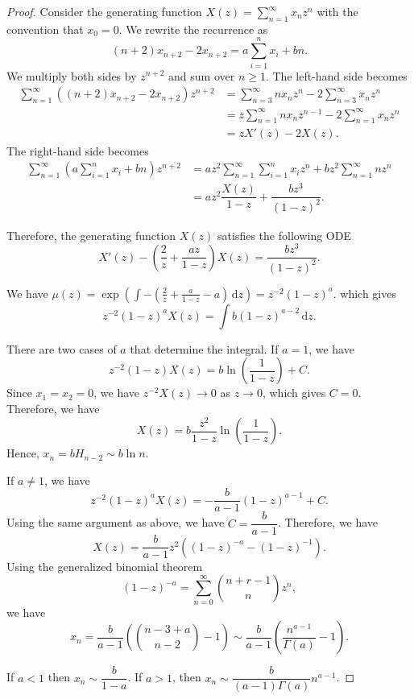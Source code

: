 \begin{proof}
  Consider the generating function $X(z) = \sum_{n=1}^{\infty} x_n z^n$ with the convention that $x_0=0$. We rewrite the recurrence as
  $$(n+2)x_{n+2} - 2x_{n+2} = a\sum_{i=1}^{n}x_i + bn.$$
  We multiply both sides by $z^{n+2}$ and sum over $n \ge 1$. The left-hand side becomes
  \begin{align*}
    \sum_{n=1}^{\infty}((n+2)x_{n+2} - 2x_{n+2})z^{n+2}
     & = \sum_{n=3}^{\infty}n x_{n}z^{n} - 2\sum_{n=3}^{\infty}x_{n}z^{n}     \\
     & = z \sum_{n=1}^{\infty}n x_{n}z^{n-1} - 2\sum_{n=1}^{\infty}x_{n}z^{n} \\
     & = z X'(z) - 2X(z).
  \end{align*}
  The right-hand side becomes
  \begin{align*}
    \sum_{n=1}^{\infty}(a\sum_{i=1}^{n}x_i + bn)z^{n+2}
     & = az^2\sum_{n=1}^{\infty}\sum_{i=1}^{n}x_i z^{n} + bz^2\sum_{n=1}^{\infty}nz^{n} \\
     & = az^2 \dfrac{X(z)}{1-z} + \dfrac{bz^3}{(1-z)^2}.
  \end{align*}

  Therefore, the generating function $X(z)$ satisfies the following ODE
  $$X'(z) - \left(\dfrac{2}{z} + \dfrac{az}{1-z}\right)X(z) = \dfrac{bz^3}{(1-z)^2}.$$

  We have $\mu(z) = \exp\left( \int -\left( \frac{2}{z} + \frac{a}{1-z} - a \right) \,\mathrm{d}z \right) = z^{-2} (1-z)^a$. which gives
  $$z^{-2} (1-z)^a X(z) = \int b (1-z)^{a-2} \,\mathrm{d}z.$$

  There are two cases of $a$ that determine the integral. If $a=1$, we have
  $$z^{-2} (1-z) X(z) = b\ln\left(\dfrac{1}{1-z}\right) + C.$$
  Since $x_1=x_2=0$, we have $z^{-2}X(z)\to 0$ as $z\to 0$, which gives $C=0$. Therefore, we have
  $$X(z) = b \dfrac{z^2}{1-z} \ln\left(\dfrac{1}{1-z}\right).$$
  Hence, $x_n = bH_{n-2} \sim b\ln n$.

  If $a \neq 1$, we have
  $$z^{-2} (1-z)^a X(z) = -\dfrac{b}{a-1} (1-z)^{a-1} + C.$$
  Using the same argument as above, we have $C= \dfrac{b}{a-1}$. Therefore, we have
  $$X(z) = \dfrac{b}{a-1}z^2 \left((1-z)^{-a}-(1-z)^{-1}\right).$$
  Using the generalized binomial theorem $$(1-z)^{-a} = \sum_{n=0}^{\infty} \binom{n+r-1}{n} z^n,$$ we have
  $$x_n = \dfrac{b}{a-1}\left(\binom{n-3+a}{n-2} - 1\right) \sim \dfrac{b}{a-1}\left(\dfrac{n^{a-1}}{\Gamma(a)}-1\right).$$

  If $a<1$ then $x_n \sim \dfrac{b}{1-a}$. If $a>1$, then $x_n  \sim \dfrac{b}{(a-1)\Gamma(a)} n^{a-1}$.
\end{proof}

